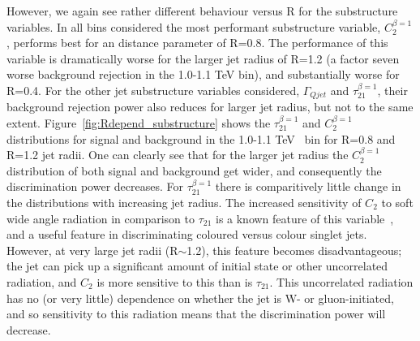 However, we again see rather
different behaviour versus R for the substructure variables. In all \pt bins
considered the most performant substructure variable, $C_2^{\beta=1}$,
performs best for an \antikt distance parameter of R=0.8. The
performance of this variable is dramatically worse for the larger jet
radius of R=1.2 (a factor seven worse background rejection in
the 1.0-1.1 TeV bin), and substantially worse for R=0.4. For the other
jet substructure variables considered, $\Gamma_{Qjet}$ and
$\tau_{21}^{\beta=1}$, their background rejection
power also reduces for larger jet radius, but not to the same
extent. Figure~\ref{fig:Rdepend_substructure} shows the
$\tau_{21}^{\beta=1}$ and $C_2^{\beta=1}$ distributions for signal and
background in the 1.0-1.1 TeV \pt~bin for R=0.8 and R=1.2 jet
radii. One can clearly see that for the larger jet radius the
$C_2^{\beta=1}$  distribution of both signal and background get wider,
and consequently the discrimination power decreases. For
$\tau_{21}^{\beta=1}$ there is comparitively little change in the distributions
with increasing jet radius. The increased sensitivity of $C_{2}$ to
soft wide angle radiation in comparison to $\tau_{21}$ is a known
feature of this variable~\cite{Larkoski:2013eya}, and a useful feature
in discriminating coloured versus colour singlet jets. However, at
very large jet radii (R$\sim$1.2), this feature becomes
disadvantageous; the jet can pick up a significant amount of initial
state or other uncorrelated radiation, and $C_{2}$ is more sensitive
to this than is $\tau_{21}$.  This uncorrelated radiation has no (or
very little) dependence on whether the jet is W- or gluon-initiated, and so sensitivity to this radiation means that the discrimination power will decrease.

